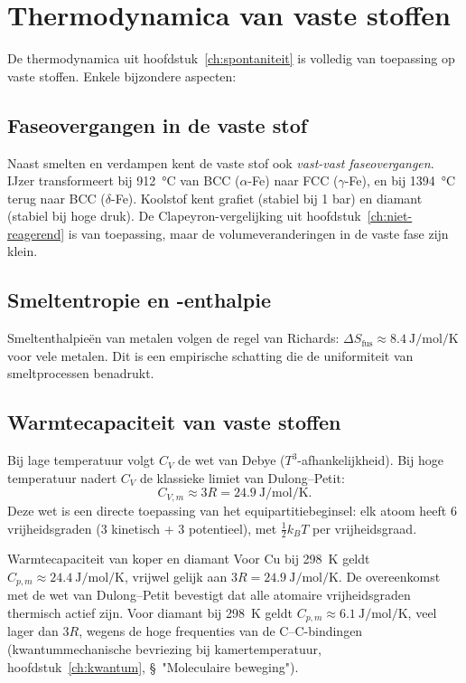 \section{Thermodynamica van vaste stoffen}

De thermodynamica uit hoofdstuk~\ref{ch:spontaniteit} is volledig van toepassing op vaste stoffen. Enkele bijzondere aspecten:

\subsection{Faseovergangen in de vaste stof}

Naast smelten en verdampen kent de vaste stof ook \emph{vast-vast faseovergangen}. IJzer transformeert bij \SI{912}{\celsius} van BCC ($\alpha$-Fe) naar FCC ($\gamma$-Fe), en bij \SI{1394}{\celsius} terug naar BCC ($\delta$-Fe). Koolstof kent grafiet (stabiel bij 1 bar) en diamant (stabiel bij hoge druk). De Clapeyron-vergelijking uit hoofdstuk~\ref{ch:niet-reagerend} is van toepassing, maar de volumeveranderingen in de vaste fase zijn klein.

\subsection{Smeltentropie en -enthalpie}

Smeltenthalpie\"en van metalen volgen de regel van Richards: $\Delta S_{\text{fus}} \approx \SI{8.4}{\joule\per\mole\per\kelvin}$ voor vele metalen. Dit is een empirische schatting die de uniformiteit van smeltprocessen benadrukt.

\subsection{Warmtecapaciteit van vaste stoffen}

Bij lage temperatuur volgt $C_V$ de wet van Debye ($T^3$-afhankelijkheid). Bij hoge temperatuur nadert $C_V$ de klassieke limiet van Dulong--Petit:
\begin{equation}
C_{V,m} \approx 3R = \SI{24.9}{\joule\per\mole\per\kelvin}.
\end{equation}
Deze wet is een directe toepassing van het equipartitiebeginsel: elk atoom heeft 6 vrijheidsgraden (3 kinetisch + 3 potentieel), met $\tfrac{1}{2}k_BT$ per vrijheidsgraad.

\begin{voorbeeld}{Warmtecapaciteit van koper en diamant}
Voor Cu bij \SI{298}{\kelvin} geldt $C_{p,m} \approx \SI{24.4}{\joule\per\mole\per\kelvin}$, vrijwel gelijk aan $3R = \SI{24.9}{\joule\per\mole\per\kelvin}$. De overeenkomst met de wet van Dulong--Petit bevestigt dat alle atomaire vrijheidsgraden thermisch actief zijn. Voor diamant bij \SI{298}{\kelvin} geldt $C_{p,m} \approx \SI{6.1}{\joule\per\mole\per\kelvin}$, veel lager dan $3R$, wegens de hoge frequenties van de C--C-bindingen (kwantummechanische bevriezing bij kamertemperatuur, hoofdstuk~\ref{ch:kwantum}, \S~"Moleculaire beweging").
\end{voorbeeld}


